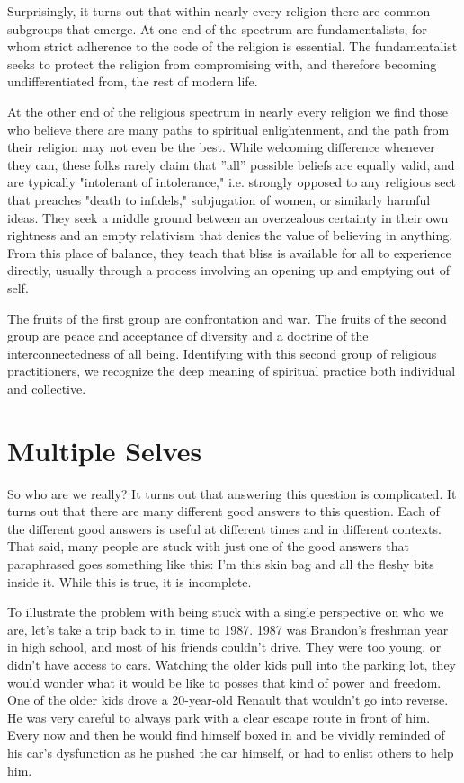\documentclass[ebook,12pt,openany,twoside]{memoir}
\begin{document}
Surprisingly, it turns out that within nearly every religion there are common
subgroups that emerge. At one end of the spectrum are fundamentalists, for whom
strict adherence to the code of the religion is essential. The fundamentalist
seeks to protect the religion from compromising with, and therefore becoming
undifferentiated from, the rest of modern life.

At the other end of the religious spectrum in nearly every religion we find
those who believe there are many paths to spiritual enlightenment, and the path
from their religion may not even be the best. While welcoming difference
whenever they can, these folks rarely claim that ''all'' possible beliefs are
equally valid, and are typically "intolerant of intolerance," i.e. strongly
opposed to any religious sect that preaches "death to infidels," subjugation of
women, or similarly harmful ideas. They seek a middle ground between an
overzealous certainty in their own rightness and an empty relativism that
denies the value of believing in anything. From this place of balance, they
teach that bliss is available for all to experience directly, usually through a
process involving an opening up and emptying out of self.

The fruits of the first group are confrontation and war. The fruits of the
second group are peace and acceptance of diversity and a doctrine of the
interconnectedness of all being. Identifying with this second group of
religious practitioners, we recognize the deep meaning of spiritual practice
both individual and collective.

\chapter{Multiple Selves}

So who are we really? It turns out that answering this question is complicated.
It turns out that there are many different good answers to this question. Each
of the different good answers is useful at different times and in different
contexts. That said, many people are stuck with just one of the good answers
that paraphrased goes something like this: I'm this skin bag and all the fleshy
bits inside it. While this is true, it is incomplete.

To illustrate the problem with being stuck with a single perspective on who we
are, let's take a trip back to in time to 1987. 1987 was Brandon's freshman
year in high school, and most of his friends couldn't drive. They were too
young, or didn't have access to cars. Watching the older kids pull into the
parking lot, they would wonder what it would be like to posses that kind of
power and freedom. One of the older kids drove a 20-year-old Renault that
wouldn't go into reverse. He was very careful to always park with a clear
escape route in front of him. Every now and then he would find himself boxed in
and be vividly reminded of his car's dysfunction as he pushed the car himself,
or had to enlist others to help him.
\end{document}
